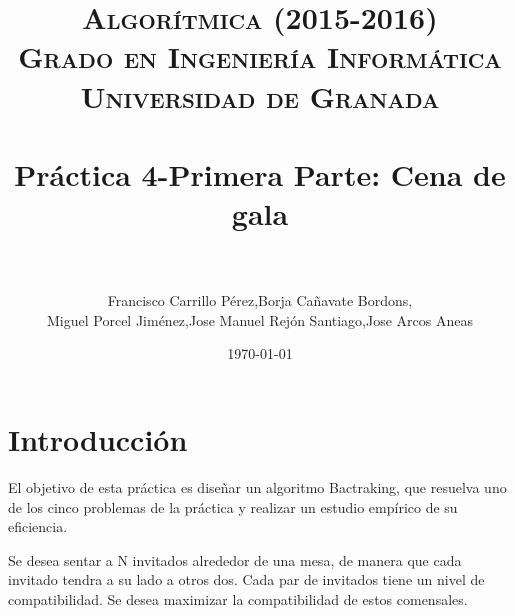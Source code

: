 
 \usepackage{algpseudocode}

\title{	
\normalfont \normalsize 
\textsc{{\bf Algorítmica (2015-2016)} \\ Grado en Ingeniería Informática \\ Universidad de Granada} \\ [25pt] %
\horrule{0.5pt} \\[0.4cm] %
\huge Práctica 4-Primera Parte: Cena de gala \\ %
\horrule{2pt} \\[0.5cm] %
}

\author{Francisco Carrillo Pérez,Borja Cañavate Bordons, \\Miguel Porcel Jiménez,Jose Manuel Rejón Santiago,Jose Arcos Aneas} %

\date{\normalsize\today} %




\maketitle %

\newpage %

\tableofcontents %

\listoffigures

\listoftables

\newpage

\section{Introducción }

	El objetivo de esta práctica es diseñar un algoritmo Bactraking, que resuelva uno de los cinco problemas de la práctica y realizar un estudio empírico de su eficiencia.
	
	Se desea sentar a N invitados alrededor de una mesa, de manera que cada invitado tendra a su lado a otros dos. Cada par de invitados tiene un nivel de compatibilidad. Se desea maximizar la compatibilidad de estos comensales.
